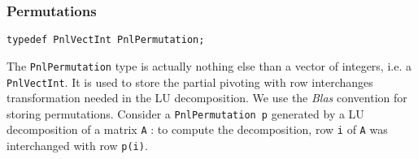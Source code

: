 \subsubsection{Permutations}

\begin{verbatim}
typedef PnlVectInt PnlPermutation;
\end{verbatim}

The \verb!PnlPermutation! type is actually nothing else than a vector of
integers, i.e. a \verb!PnlVectInt!. It is used to store the partial pivoting
with row interchanges transformation needed in the LU decomposition.  We use the
{\it Blas} convention for storing permutations. Consider a \verb!PnlPermutation p!
generated by a LU decomposition of a matrix \verb!A! : to compute the
decomposition, row \verb!i! of \verb!A! was interchanged with row \verb!p(i)!.


